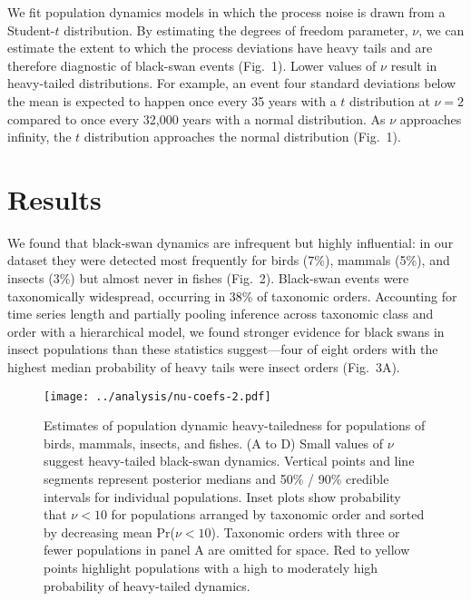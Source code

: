 \documentclass[9pt,twocolumn,twoside]{pnas-new}
\begin{document}
We fit population dynamics models in which the process noise is
drawn from a Student-$t$ distribution. By estimating the degrees of freedom
parameter, \(\nu\), we can estimate the extent to which the process deviations
have heavy tails and are therefore diagnostic of black-swan events (Fig.~1).
Lower values of \(\nu\) result in heavy-tailed distributions.
For example, an event four standard deviations below the mean
is expected to happen once every 35 years with a $t$ distribution at \(\nu = 2\)
compared to once every 32,000 years with a normal distribution.
As \(\nu\) approaches infinity, the $t$
distribution approaches the normal distribution (Fig.~1).

\section*{Results}

We found that black-swan dynamics are infrequent but highly
influential: in our dataset they were detected most
frequently for birds (7\%), mammals (5\%), and
insects (3\%) but almost never in fishes (Fig.~2). Black-swan
events were taxonomically widespread, occurring in 38\% of taxonomic orders.
Accounting for time series length and partially pooling inference across
taxonomic class and order with a hierarchical model, we found stronger evidence
for black swans in insect populations than these statistics suggest---four of
eight orders with the highest median probability of heavy tails were insect
orders (Fig.~3A).

\begin{figure}[htb]
\centering
\texttt{[image: ../analysis/nu-coefs-2.pdf]}
\caption{Estimates of population dynamic heavy-tailedness for
populations of birds, mammals, insects, and fishes. (A to D)
Small values of \(\nu\) suggest heavy-tailed black-swan dynamics. Vertical
points and line segments represent posterior medians and 50\% / 90\% credible
intervals for individual populations. Inset plots show probability that \(\nu
< 10\) for populations arranged by taxonomic order and sorted by decreasing
mean Pr(\(\nu < 10\)). Taxonomic orders with three or fewer populations in
panel A are omitted for space. Red to yellow points highlight populations
with a high to moderately high probability of heavy-tailed dynamics.
}
\label{fig:2}
\end{figure}
\end{document}

